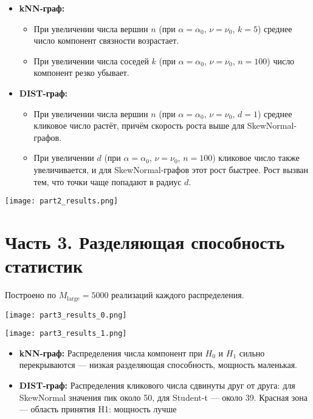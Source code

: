 \documentclass[12pt,a4paper]{article}
\begin{document}
\begin{itemize}
  \item \textbf{kNN-граф:}
    \begin{itemize}
      \item При увеличении числа вершин \(n\) (при \(\alpha=\alpha_0\), \(\nu=\nu_0\), \(k=5\)) среднее число компонент связности возрастает.
      \item При увеличении числа соседей \(k\) (при \(\alpha=\alpha_0\), \(\nu=\nu_0\), \(n=100\)) число компонент резко убывает.
    \end{itemize}

  \item \textbf{DIST-граф:}
    \begin{itemize}
      \item При увеличении числа вершин \(n\) (при \(\alpha=\alpha_0\), \(\nu=\nu_0\), \(d=1\)) среднее кликовое число растёт, причём скорость роста выше для SkewNormal-графов.
      \item При увеличении \(d\) (при \(\alpha=\alpha_0\), \(\nu=\nu_0\), \(n=100\)) кликовое число также увеличивается, и для SkewNormal-графов этот рост быстрее. Рост вызван тем, что точки чаще попадают в радиус \(d\).
    \end{itemize}
\end{itemize}


\begin{center}
  \texttt{[image: part2\_results.png]}
\end{center}

\section*{Часть 3. Разделяющая способность статистик}
\vspace{-1em}
\noindent
Построено по $M_{\text{large}}=5000$ реализаций каждого распределения.

\begin{center}
  \texttt{[image: part3\_results\_0.png]}
\end{center}
\begin{center}
  \texttt{[image: part3\_results\_1.png]}
\end{center}

\begin{itemize}
  \item \textbf{kNN-граф:} Распределения числа компонент при $H_0$ и $H_1$ сильно перекрываются — низкая разделяющая способность, мощность маленькая.
  \item \textbf{DIST-граф:} Распределения кликового числа сдвинуты друг от друга: для SkewNormal значения пик около 50, для Student-t — около 39. Красная зона — область принятия H1: мощность лучше
\end{itemize}
\end{document}
